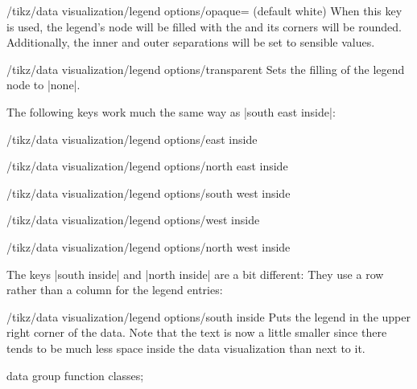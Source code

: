 \begin{key}{/tikz/data visualization/legend options/opaque= (default white)}
    When this key is used, the legend's node will be filled with the
     and its corners will be rounded. Additionally, the inner and
    outer separations will be set to sensible values.
\end{key}
%
\begin{key}{/tikz/data visualization/legend options/transparent}
    Sets the filling of the legend node to |none|.
\end{key}

The following keys work much the same way as |south east inside|:

\begin{key}{/tikz/data visualization/legend options/east inside}
\end{key}
%
\begin{key}{/tikz/data visualization/legend options/north east inside}
\end{key}
%
\begin{key}{/tikz/data visualization/legend options/south west inside}
\end{key}
%
\begin{key}{/tikz/data visualization/legend options/west inside}
\end{key}
%
\begin{key}{/tikz/data visualization/legend options/north west inside}
\end{key}

The keys |south inside| and |north inside| are a bit different: They use a row
rather than a column for the legend entries:

\begin{key}{/tikz/data visualization/legend options/south inside}
    Puts the legend in the upper right corner of the data. Note that the text
    is now a little smaller since there tends to be much less space inside the
    data visualization than next to it.
\begin{codeexample}[
    width=8cm,
    preamble={\usetikzlibrary{datavisualization.formats.functions}},
    pre={\tikz \datavisualization data group {function classes} = {
  data [set=log, format=function] {
    var x : interval [0.2:2.5];
    func y = ln(\value x);
  }
  data [set=lin, format=function] {
    var x : interval [-2:2.5];
    func y = 0.5*\value x;
  }
  data [set=squared, format=function] {
    var x : interval [-1.5:1.5];
    func y = \value x*\value x;
  }
  data [set=exp, format=function] {
    var x : interval [-2.5:1];
    func y = exp(\value x);
  }
};},
]
\tikz \datavisualization [
  scientific axes,
  visualize as smooth line/.list={log, lin},
  legend=south inside,
  log=    {label in legend={text=$\log x$}},
  lin=    {label in legend={text=$x/2$}},
  style sheet=strong colors]
data group {function classes};
\end{codeexample}
\end{key}

